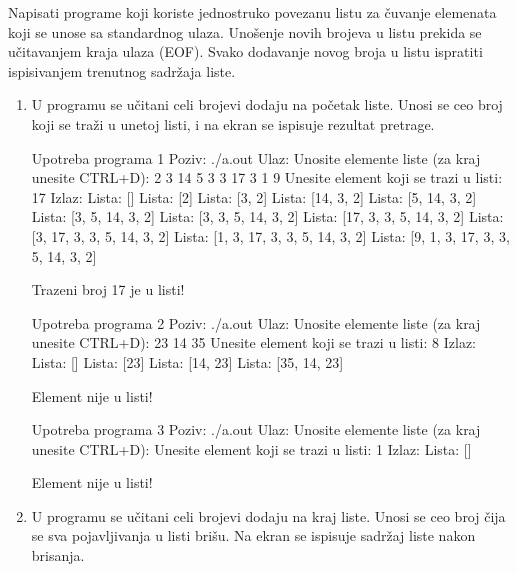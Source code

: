 \begin{Exercise}[label=601]
Napisati programe koji koriste jednostruko povezanu listu za čuvanje elemenata koji se unose sa standardnog ulaza.  Unošenje novih brojeva u listu prekida se učitavanjem kraja ulaza (EOF). Svako dodavanje novog broja u listu ispratiti ispisivanjem trenutnog sadržaja liste. 

\begin{enumerate}
\item[(1)] U programu se učitani celi brojevi dodaju na početak liste. 
    Unosi se ceo broj koji se traži u unetoj listi, i na ekran se ispisuje rezultat pretrage. 

\begin{maxitest}
\begin{test}{Upotreba programa 1}
Poziv: ./a.out
Ulaz:
  Unosite elemente liste (za kraj unesite CTRL+D): 2 3 14 5 3 3 17 3 1 9 
  Unesite element koji se trazi u listi: 17
Izlaz:
  Lista: []
  Lista: [2]
  Lista: [3, 2]
  Lista: [14, 3, 2]
  Lista: [5, 14, 3, 2]
  Lista: [3, 5, 14, 3, 2]
  Lista: [3, 3, 5, 14, 3, 2]
  Lista: [17, 3, 3, 5, 14, 3, 2]
  Lista: [3, 17, 3, 3, 5, 14, 3, 2]
  Lista: [1, 3, 17, 3, 3, 5, 14, 3, 2]
  Lista: [9, 1, 3, 17, 3, 3, 5, 14, 3, 2]

  Trazeni broj 17 je u listi!
\end{test}
\end{maxitest}
\begin{maxitest}
\begin{test}{Upotreba programa 2}
Poziv: ./a.out
Ulaz:
  Unosite elemente liste (za kraj unesite CTRL+D): 23 14 35
  Unesite element koji se trazi u listi: 8
Izlaz:
  Lista: []
  Lista: [23]
  Lista: [14, 23]
  Lista: [35, 14, 23]
  
  Element nije u listi!
\end{test}
\end{maxitest}
\begin{maxitest}
\begin{test}{Upotreba programa 3}
Poziv: ./a.out
Ulaz:
  Unosite elemente liste (za kraj unesite CTRL+D): 
  Unesite element koji se trazi u listi: 1
Izlaz:
  Lista: []
  
  Element nije u listi!
\end{test}
\end{maxitest}


\item[(2)] U programu se učitani celi brojevi dodaju na kraj liste. 
    Unosi se ceo broj čija se sva pojavljivanja u listi brišu. Na ekran se ispisuje sadržaj liste nakon brisanja.


\end{enumerate}
\end{Exercise}
